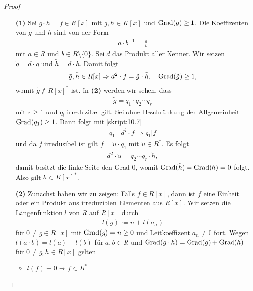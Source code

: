 \begin{proof}\
	\begin{enumerate}
		\item[\textbf{(1)}]		
		Sei $g \cdot h = f \in R[x]$ mit $g, h \in K[x]$ und $\operatorname{Grad}(g) \geq 1$.
		Die Koeffizenten von $g $ und $h$ sind von der Form
		\begin{align*}
		a \cdot b^{-1} = \frac{a}{b}
		\end{align*}				
		mit $a \in R$ und $b \in R \setminus \lbrace 0 \rbrace$.
		Sei $d$ das Produkt aller Nenner.
		Wir setzen $\tilde{g} = d \cdot g$ und $\tilde{h} = d \cdot h$.
		Damit folgt
		\begin{align*}
		\tilde{g}, \tilde{h} \in R[x]
		\Rightarrow
		d^2 \cdot f = \tilde{g} \cdot \tilde{h}, \quad \operatorname{Grad}(\tilde{g}) \geq 1,
		\end{align*}				
		womit $ \tilde{g} \notin R[x]^\ast$ ist.
		In \textbf{(2)} werden wir sehen, dass 
		\begin{align*}
		\tilde{g} = q_1 \cdot q_2 \cdots q_r
		\end{align*}
		mit $r \geq 1$ und $q_i$ irreduzibel gilt.
		Sei ohne Beschränkung der Allgemeinheit $\operatorname{Grad}(q_1) \geq 1$.
		Dann folgt mit \ref{skript:10.7}
		\begin{align*}
		q_1 \mid d^2 \cdot f 
		\Rightarrow
		q_1 | f
		\end{align*}
		und da $f$ irreduzibel ist gilt $f = \tilde{u} \cdot q_1$ mit $\tilde{u} \in R^\ast$.
		Es folgt
		\begin{align*}
		d^2 \cdot \tilde{u} = q_2 \cdots q_r \cdot \tilde{h},
		\end{align*}
		damit besitzt die linke Seite den Grad $0$, womit
		$\operatorname{Grad}(\tilde{h}) = \operatorname{Grad}(h) = 0$ folgt.
		Also gilt $h \in K[x]^\ast$.
		\item[\textbf{(2)}]	
		Zunächst haben wir zu zeigen:
		Falls $f \in R[x]$, dann ist $f$ eine Einheit oder ein Produkt aus irreduziblen Elementen
		aus $R[x]$.
		Wir setzen die Längenfunktion $l$ von $R$ auf $R[x]$ durch
		\begin{align*}
		l(g) := n + l(a_n)
		\end{align*}
		für $0 \neq g \in R[x]$ mit $\operatorname{Grad}(g) = n \geq 0$ und Leitkoeffizent $a_n \neq 0$ fort.
		Wegen $l(a\cdot b) = l(a)+l(b)$ für $a,b \in R$ 
		und $\operatorname{Grad}(g \cdot h) = \operatorname{Grad}(g) + \operatorname{Grad}(h)$ für $0 \neq g,h \in R[x]$ gelten
		\begin{itemize}
			\item
			$l(f) = 0 \Rightarrow f \in R^\ast$
			

\end{itemize}
\end{enumerate}
\end{proof}
